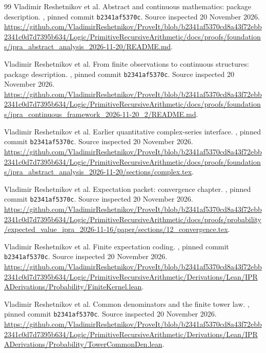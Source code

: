 \begin{thebibliography}{99}
Vladimir Reshetnikov et al. Abstract and continuous mathematics: package description.
\repo, pinned commit \texttt{b2341af5370c}. Source inspected 20 November 2026.
\url{https://github.com/VladimirReshetnikov/ProveIt/blob/b2341af5370cd8a43f72ebb2341c0d7d7395b634/Logic/PrimitiveRecursiveArithmetic/docs/proofs/foundations/ipra_abstract_analysis_2026-11-20/README.md}.

Vladimir Reshetnikov et al. From finite observations to continuous structures: package description.
\repo, pinned commit \texttt{b2341af5370c}. Source inspected 20 November 2026.
\url{https://github.com/VladimirReshetnikov/ProveIt/blob/b2341af5370cd8a43f72ebb2341c0d7d7395b634/Logic/PrimitiveRecursiveArithmetic/docs/proofs/foundations/ipra_continuous_framework_2026-11-20_2/README.md}.

Vladimir Reshetnikov et al. Earlier quantitative complex-series interface.
\repo, pinned commit \texttt{b2341af5370c}. Source inspected 20 November 2026.
\url{https://github.com/VladimirReshetnikov/ProveIt/blob/b2341af5370cd8a43f72ebb2341c0d7d7395b634/Logic/PrimitiveRecursiveArithmetic/docs/proofs/foundations/ipra_abstract_analysis_2026-11-20/sections/complex.tex}.

Vladimir Reshetnikov et al. Expectation packet: convergence chapter.
\repo, pinned commit \texttt{b2341af5370c}. Source inspected 20 November 2026.
\url{https://github.com/VladimirReshetnikov/ProveIt/blob/b2341af5370cd8a43f72ebb2341c0d7d7395b634/Logic/PrimitiveRecursiveArithmetic/docs/proofs/probability/expected_value_ipra_2026-11-16/paper/sections/12_convergence.tex}.

Vladimir Reshetnikov et al. Finite expectation coding.
\repo, pinned commit \texttt{b2341af5370c}. Source inspected 20 November 2026.
\url{https://github.com/VladimirReshetnikov/ProveIt/blob/b2341af5370cd8a43f72ebb2341c0d7d7395b634/Logic/PrimitiveRecursiveArithmetic/Derivations/Lean/IPRADerivations/Probability/FiniteKernel.lean}.

Vladimir Reshetnikov et al. Common denominators and the finite tower law.
\repo, pinned commit \texttt{b2341af5370c}. Source inspected 20 November 2026.
\url{https://github.com/VladimirReshetnikov/ProveIt/blob/b2341af5370cd8a43f72ebb2341c0d7d7395b634/Logic/PrimitiveRecursiveArithmetic/Derivations/Lean/IPRADerivations/Probability/TowerCommonDen.lean}.


\end{thebibliography}
